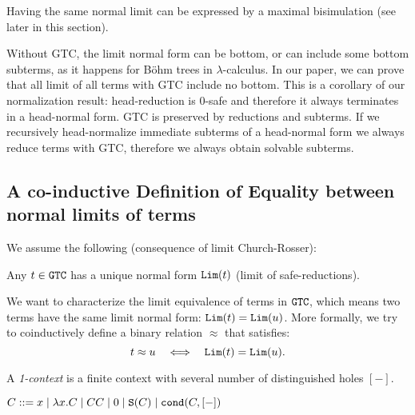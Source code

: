 
Having the same normal limit can be expressed by a maximal bisimulation 
(see later in this section).
 
      Without GTC, the limit normal form can be bottom, or can include some bottom subterms, as it happens for B\"{o}hm trees in $\lambda $-calculus.  In our paper, we can prove that all limit of all terms with GTC include no bottom. This is a corollary of our normalization result: head-reduction is 0-safe and therefore it always terminates in a head-normal form. GTC is preserved by reductions and subterms. If we recursively head-normalize immediate subterms of a head-normal form we always reduce terms with GTC, therefore we always obtain solvable subterms.
 
 
 
\subsection{A co-inductive Definition of Equality between normal limits of terms}

\vspace{10pt}

\begin{remark}
  We assume the following (consequence of limit Church-Rosser):
  \begin{center}
    Any $t\in {\tt GTC}$ has a unique normal form ${\tt Lim}(t)$ (limit of safe-reductions).
  \end{center}
\end{remark}

\quad
We want to characterize the limit equivalence of terms in ${\tt GTC}$, 
which means two terms have the same limit normal form: ${\tt Lim}(t) = {\tt Lim}(u)$. 
More formally, we try to coinductively define a binary relation $\approx$ that satisfies:
\[
t \approx u \quad \Longleftrightarrow \quad {\tt Lim}(t) = {\tt Lim}(u). 
\]

A {\em 1-context} is a finite context with several number of distinguished holes $[-]$.

\begin{definition}[0-context]
  \begin{center}
    $C ::= x \mid \lambda x.C \mid CC \mid 0 \mid {\tt S}(C) \mid {\tt cond}(C,[-])$
  \end{center}
\end{definition}


